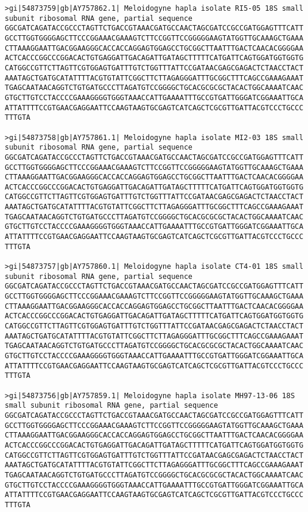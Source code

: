 \documentclass[11pt]{article}
\begin{document}
\begin{Verbatim}[commandchars=\\\{\}]
>gi|54873759|gb|AY757862.1| Meloidogyne hapla isolate RI5-05 18S small subunit ribosomal RNA gene, partial sequence
GGCGATCAGATACCGCCCTAGTTCTGACCGTAAACGATGCCAACTAGCGATCCGCCGATGGAGTTTCATT
GCCTTGGTGGGGAGCTTCCCGGAAACGAAAGTCTTCCGGTTCCGGGGGAAGTATGGTTGCAAAGCTGAAA
CTTAAAGGAATTGACGGAAGGGCACCACCAGGAGTGGAGCCTGCGGCTTAATTTGACTCAACACGGGGAA
ACTCACCCGGCCCGGACACTGTGAGGATTGACAGATTGATAGCTTTTTCATGATTCAGTGGATGGTGGTG
CATGGCCGTTCTTAGTTCGTGGAGTGATTTGTCTGGTTTATTCCGATAACGAGCGAGACTCTAACCTACT
AAATAGCTGATGCATATTTTACGTGTATTCGGCTTCTTAGAGGGATTTGCGGCTTTCAGCCGAAAGAAAT
TGAGCAATAACAGGTCTGTGATGCCCTTAGATGTCCGGGGCTGCACGCGCGCTACACTGGCAAAATCAAC
GTGCTTGTCCTACCCCGAAAGGGGTGGGTAAACCATTGAAAATTTGCCGTGATTGGGATCGGAAATTGCA
ATTATTTTCCGTGAACGAGGAATTCCAAGTAAGTGCGAGTCATCAGCTCGCGTTGATTACGTCCCTGCCC
TTTGTA

>gi|54873758|gb|AY757861.1| Meloidogyne hapla isolate MI2-03 18S small subunit ribosomal RNA gene, partial sequence
GGCGATCAGATACCGCCCTAGTTCTGACCGTAAACGATGCCAACTAGCGATCCGCCGATGGAGTTTCATT
GCCTTGGTGGGGAGCTTCCCGGAAACGAAAGTCTTCCGGTTCCGGGGGAAGTATGGTTGCAAAGCTGAAA
CTTAAAGGAATTGACGGAAGGGCACCACCAGGAGTGGAGCCTGCGGCTTAATTTGACTCAACACGGGGAA
ACTCACCCGGCCCGGACACTGTGAGGATTGACAGATTGATAGCTTTTTCATGATTCAGTGGATGGTGGTG
CATGGCCGTTCTTAGTTCGTGGAGTGATTTGTCTGGTTTATTCCGATAACGAGCGAGACTCTAACCTACT
AAATAGCTGATGCATATTTTACGTGTATTCGGCTTCTTAGAGGGATTTGCGGCTTTCAGCCGAAAGAAAT
TGAGCAATAACAGGTCTGTGATGCCCTTAGATGTCCGGGGCTGCACGCGCGCTACACTGGCAAAATCAAC
GTGCTTGTCCTACCCCGAAAGGGGTGGGTAAACCATTGAAAATTTGCCGTGATTGGGATCGGAAATTGCA
ATTATTTTCCGTGAACGAGGAATTCCAAGTAAGTGCGAGTCATCAGCTCGCGTTGATTACGTCCCTGCCC
TTTGTA

>gi|54873757|gb|AY757860.1| Meloidogyne hapla isolate CT4-01 18S small subunit ribosomal RNA gene, partial sequence
GGCGATCAGATACCGCCCTAGTTCTGACCGTAAACGATGCCAACTAGCGATCCGCCGATGGAGTTTCATT
GCCTTGGTGGGGAGCTTCCCGGAAACGAAAGTCTTCCGGTTCCGGGGGAAGTATGGTTGCAAAGCTGAAA
CTTAAAGGAATTGACGGAAGGGCACCACCAGGAGTGGAGCCTGCGGCTTAATTTGACTCAACACGGGGAA
ACTCACCCGGCCCGGACACTGTGAGGATTGACAGATTGATAGCTTTTTCATGATTCAGTGGATGGTGGTG
CATGGCCGTTCTTAGTTCGTGGAGTGATTTGTCTGGTTTATTCCGATAACGAGCGAGACTCTAACCTACT
AAATAGCTGATGCATATTTTACGTGTATTCGGCTTCTTAGAGGGATTTGCGGCTTTCAGCCGAAAGAAAT
TGAGCAATAACAGGTCTGTGATGCCCTTAGATGTCCGGGGCTGCACGCGCGCTACACTGGCAAAATCAAC
GTGCTTGTCCTACCCCGAAAGGGGTGGGTAAACCATTGAAAATTTGCCGTGATTGGGATCGGAAATTGCA
ATTATTTTCCGTGAACGAGGAATTCCAAGTAAGTGCGAGTCATCAGCTCGCGTTGATTACGTCCCTGCCC
TTTGTA

>gi|54873756|gb|AY757859.1| Meloidogyne hapla isolate MH97-13-06 18S small subunit ribosomal RNA gene, partial sequence
GGCGATCAGATACCGCCCTAGTTCTGACCGTAAACGATGCCAACTAGCGATCCGCCGATGGAGTTTCATT
GCCTTGGTGGGGAGCTTCCCGGAAACGAAAGTCTTCCGGTTCCGGGGGAAGTATGGTTGCAAAGCTGAAA
CTTAAAGGAATTGACGGAAGGGCACCACCAGGAGTGGAGCCTGCGGCTTAATTTGACTCAACACGGGGAA
ACTCACCCGGCCCGGACACTGTGAGGATTGACAGATTGATAGCTTTTTCATGATTCAGTGGATGGTGGTG
CATGGCCGTTCTTAGTTCGTGGAGTGATTTGTCTGGTTTATTCCGATAACGAGCGAGACTCTAACCTACT
AAATAGCTGATGCATATTTTACGTGTATTCGGCTTCTTAGAGGGATTTGCGGCTTTCAGCCGAAAGAAAT
TGAGCAATAACAGGTCTGTGATGCCCTTAGATGTCCGGGGCTGCACGCGCGCTACACTGGCAAAATCAAC
GTGCTTGTCCTACCCCGAAAGGGGTGGGTAAACCATTGAAAATTTGCCGTGATTGGGATCGGAAATTGCA
ATTATTTTCCGTGAACGAGGAATTCCAAGTAAGTGCGAGTCATCAGCTCGCGTTGATTACGTCCCTGCCC
TTTGTA


\end{Verbatim}
\end{document}
